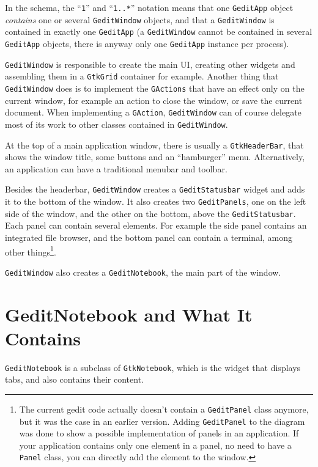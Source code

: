 In the schema, the ``\texttt{1}'' and ``\texttt{1..*}'' notation means that one \lstinline{GeditApp} object \emph{contains} one or several \lstinline{GeditWindow} objects, and that a \lstinline{GeditWindow} is contained in exactly one \lstinline{GeditApp} (a \lstinline{GeditWindow} cannot be contained in several \lstinline{GeditApp} objects, there is anyway only one \lstinline{GeditApp} instance per process).

\lstinline{GeditWindow} is responsible to create the main UI, creating other widgets and assembling them in a \lstinline{GtkGrid} container for example. Another thing that \lstinline{GeditWindow} does is to implement the \lstinline{GActions} that have an effect only on the current window, for example an action to close the window, or save the current document. When implementing a \lstinline{GAction}, \lstinline{GeditWindow} can of course delegate most of its work to other classes contained in \lstinline{GeditWindow}.

At the top of a main application window, there is usually a \lstinline{GtkHeaderBar}, that shows the window title, some buttons and an ``hamburger'' menu. Alternatively, an application can have a traditional menubar and toolbar.

Besides the headerbar, \lstinline{GeditWindow} creates a \lstinline{GeditStatusbar} widget and adds it to the bottom of the window. It also creates two \lstinline{GeditPanels}, one on the left side of the window, and the other on the bottom, above the \lstinline{GeditStatusbar}. Each panel can contain several elements. For example the side panel contains an integrated file browser, and the bottom panel can contain a terminal, among other things\footnote{The current gedit code actually doesn't contain a \lstinline{GeditPanel} class anymore, but it was the case in an earlier version. Adding \lstinline{GeditPanel} to the diagram was done to show a possible implementation of panels in an application. If your application contains only one element in a panel, no need to have a \lstinline{Panel} class, you can directly add the element to the window.}.

\lstinline{GeditWindow} also creates a \lstinline{GeditNotebook}, the main part of the window.

\section{GeditNotebook and What It Contains}

\lstinline{GeditNotebook} is a subclass of \lstinline{GtkNotebook}, which is the widget that displays tabs, and also contains their content.

